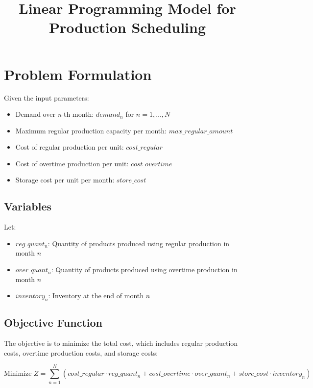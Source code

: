 \documentclass{article}
\begin{document}
\title{Linear Programming Model for Production Scheduling}
\author{}
\date{}
\maketitle

\section*{Problem Formulation}

Given the input parameters:
\begin{itemize}
    \item Demand over \textit{n}-th month: \(demand_n\) for \(n = 1, \ldots, N\)
    \item Maximum regular production capacity per month: \(max\_regular\_amount\)
    \item Cost of regular production per unit: \(cost\_regular\)
    \item Cost of overtime production per unit: \(cost\_overtime\)
    \item Storage cost per unit per month: \(store\_cost\)
\end{itemize}

\subsection*{Variables}

Let:
\begin{itemize}
    \item \(reg\_quant_n\): Quantity of products produced using regular production in month \(n\)
    \item \(over\_quant_n\): Quantity of products produced using overtime production in month \(n\)
    \item \(inventory_n\): Inventory at the end of month \(n\)
\end{itemize}

\subsection*{Objective Function}

The objective is to minimize the total cost, which includes regular production costs, overtime production costs, and storage costs:

\[
\text{Minimize } Z = \sum_{n=1}^{N} (cost\_regular \cdot reg\_quant_n + cost\_overtime \cdot over\_quant_n + store\_cost \cdot inventory_n)
\]
\end{document}
